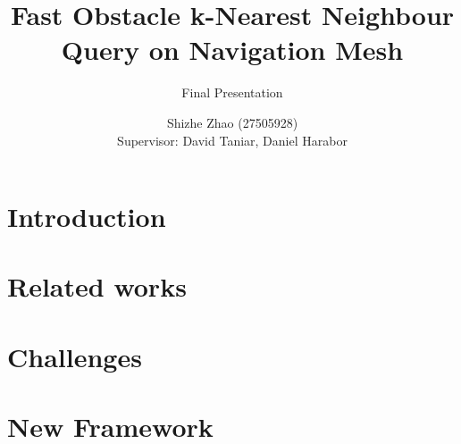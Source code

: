\documentclass{beamer}
\title[Fast Obstacle k-Nearest Neighbour Query on Navigation Mesh]{
    Fast Obstacle k-Nearest Neighbour Query on Navigation Mesh \\
}
\subtitle {Final Presentation}
\date{}
\author[Shizhe Zhao]{
    Shizhe Zhao (27505928)\\
    Supervisor: David Taniar, Daniel Harabor
}
\begin{document}

\frame{\titlepage}
\section[]{}

\section{Introduction}

\section{Related works}

\section{Challenges}

\section{New Framework}


\end{document}
